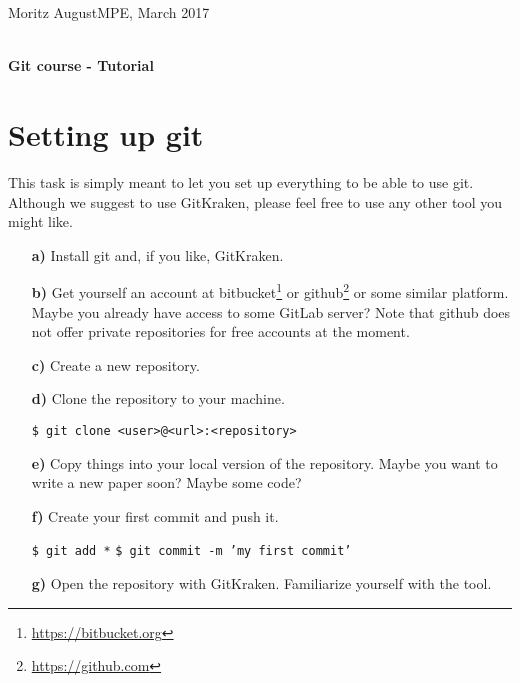 \documentclass[11pt]{article}
\begin{document}
  {\normalsize  
Moritz August\hfill MPE, March 2017\\ 
    \mbox{}\\ [2ex] }

\thispagestyle{empty}
\begin{center}
    {\LARGE\sffamily\bfseries Git course - Tutorial}
\end{center}


\section*{Setting up git}
This task is simply meant to let you set up everything to be able to use git. Although we suggest to use GitKraken, please feel free to use any other tool you might like.
\begin{itemize}
\item[\bf{a)}] Install git and, if you like, GitKraken.
\item[\bf{b)}] Get yourself an account at bitbucket\footnote{\url{https://bitbucket.org}} or github\footnote{\url{https://github.com}} or some similar platform. Maybe you already have access to some GitLab server? Note that github does not offer private repositories for free accounts at the moment.
\item[\bf{c)}] Create a new repository.  
\item[\bf{d)}] Clone the repository to your machine.
\begin{framed}
\texttt{\$ git clone <user>@<url>:<repository>}
\end{framed}
\item[\bf{e)}] Copy things into your local version of the repository. Maybe you want to write a new paper soon? Maybe some code?
\item[\bf{f)}] Create your first commit and push it.
\begin{framed}
\texttt{\$ git add *} \newline
\texttt{\$ git commit -m 'my first commit'}
\end{framed}
\item[\bf{g)}] Open the repository with GitKraken. Familiarize yourself with the tool.
\end{itemize}
\end{document}
